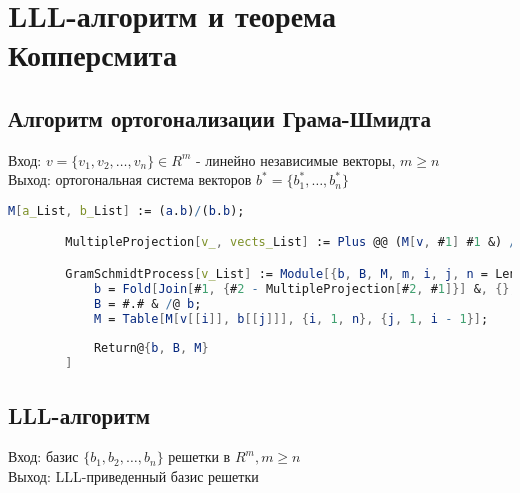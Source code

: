 
\chapter{LLL-алгоритм и теорема Копперсмита}

	\section{Алгоритм ортогонализации Грама-Шмидта}
		Вход: $v=\{v_1, v_2, \dots, v_n \} \in R^m$ - линейно независимые векторы, $m \ge n$ \\
		Выход: ортогональная система векторов $b^* = \{b^{*}_1, \dots, b^{*}_n \}$

		\begin{lstlisting}[language=Mathematica,caption={
      		Алгоритм ортогонализации Грама-Шмидта	
    	}]
		M[a_List, b_List] := (a.b)/(b.b);

		MultipleProjection[v_, vects_List] := Plus @@ (M[v, #1] #1 &) /@ vects;

		GramSchmidtProcess[v_List] := Module[{b, B, M, m, i, j, n = Length@v},
  			b = Fold[Join[#1, {#2 - MultipleProjection[#2, #1]}] &, {}, v];
  			B = #.# & /@ b;
  			M = Table[M[v[[i]], b[[j]]], {i, 1, n}, {j, 1, i - 1}];
  
  			Return@{b, B, M}
  		]
    	\end{lstlisting}

	\section{LLL-алгоритм}		
		Вход: базис $\{b_1,b_2, \dots, b_n \}$ решетки в $R^m, m \ge n$ \\
		Выход: LLL-приведенный базис решетки

